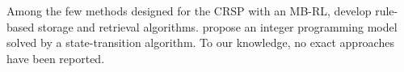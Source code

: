 \documentclass[12pt]{article}
\begin{document}







Among the few methods designed for the CRSP with an MB-RL, \citet{moon2005simulation} develop rule-based storage and retrieval algorithms. \citet{yu2023analysis} propose an integer programming model solved by a state-transition algorithm. To our knowledge, no exact approaches have been reported.


\end{document}
